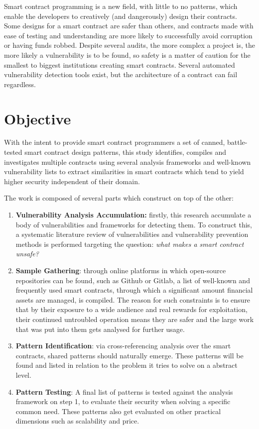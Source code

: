 Smart contract programming is a new field, with little to no patterns, which enable the developers to creatively (and dangerously) design their contracts. Some designs for a smart contract are safer than others, and contracts made with ease of testing and understanding are more likely to successfully avoid corruption or having funds robbed. Despite several audits, the more complex a project is, the more likely a vulnerability is to be found, so safety is a matter of caution for the smallest to biggest institutions creating smart contracts. Several automated vulnerability detection tools exist, but the architecture of a contract can fail regardless.

\section{Objective}

With the intent to provide smart contract programmers a set of canned, battle-tested smart contract design patterns, this study identifies, compiles and investigates multiple contracts using several analysis frameworks and well-known vulnerability lists to extract similarities in smart contracts which tend to yield higher security independent of their domain.

The work is composed of several parts which construct on top of the other:

\begin{enumerate}
\item \textbf{Vulnerability Analysis Accumulation:} firstly, this research accumulate a body of vulnerabilities and frameworks for detecting them. To construct this, a systematic literature review of vulnerabilities and vulnerability prevention methods is performed targeting the question: \textit{what makes a smart contract unsafe?} 
\item \textbf{Sample Gathering}: through online platforms in which open-source repositories can be found, such as Github or Gitlab, a list of well-known and frequently used smart contracts, through which a significant amount financial assets are managed, is compiled. The reason for such constraints is to ensure that by their exposure to a wide audience and real rewards for exploitation, their continued untroubled operation means they are safer and the large work that was put into them gets analysed for further usage.
\item \textbf{Pattern Identification}: via cross-referencing analysis over the smart contracts, shared patterns should naturally emerge. These patterns will be found and listed in relation to the problem it tries to solve on a abstract level.
\item \textbf{Pattern Testing}: A final list of patterns is tested against the analysis framework on step 1, to evaluate their security when solving a specific common need. These patterns also get evaluated on other practical dimensions such as scalability and price.
\end{enumerate}

